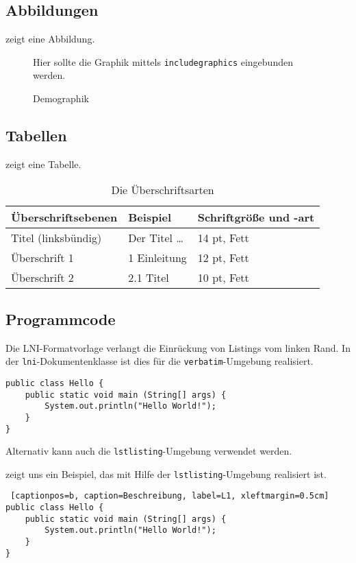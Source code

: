 \documentclass[english,utf8]{lni}
\begin{document}
\subsection{Abbildungen}
 zeigt eine Abbildung.

\begin{figure}
  \centering
  Hier sollte die Graphik mittels \texttt{includegraphics} eingebunden werden.

  \caption{Demographik}
  \label{fig:demo}
\end{figure}

\subsection{Tabellen}
 zeigt eine Tabelle.

\begin{table}
\centering
\begin{tabular}{lll}
\toprule
Überschriftsebenen & Beispiel & Schriftgröße und -art \\
\midrule
Titel (linksbündig) & Der Titel \ldots & 14 pt, Fett\\
Überschrift 1 & 1 Einleitung & 12 pt, Fett\\
Überschrift 2 & 2.1 Titel & 10 pt, Fett\\
\bottomrule
\end{tabular}
\caption{Die Überschriftsarten}
\label{tab:demo}
\end{table}

\subsection{Programmcode}
Die LNI-Formatvorlage verlangt die Einrückung von Listings vom linken Rand.
In der \texttt{lni}-Dokumentenklasse ist dies für die \texttt{verbatim}-Umgebung realisiert.

\begin{verbatim}
public class Hello { 
    public static void main (String[] args) { 
        System.out.println("Hello World!"); 
    } 
} 
\end{verbatim}

Alternativ kann auch die \texttt{lstlisting}-Umgebung verwendet werden.

 zeigt uns ein Beispiel, das mit Hilfe der \texttt{lstlisting}-Umgebung realisiert ist.

\lstset{basicstyle=\ttfamily}
\begin{lstlisting} [captionpos=b, caption=Beschreibung, label=L1, xleftmargin=0.5cm]
public class Hello { 
    public static void main (String[] args) { 
        System.out.println("Hello World!"); 
    } 
}
\end{lstlisting}
\end{document}
